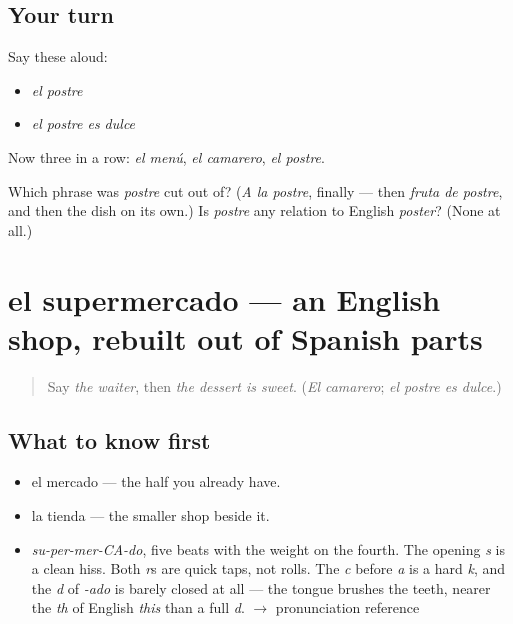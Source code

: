 \subsection*{Your turn}
Say these aloud:

\begin{itemize}
\raggedright
  \item \emph{el postre}
  \item \emph{el postre es dulce}
\end{itemize}

Now three in a row: \emph{el menú}, \emph{el camarero}, \emph{el postre}.

\begin{tcolorbox}[breakable,colback=teal!4,colframe=teal!35!black,title={Before you move on}]
Which phrase was \emph{postre} cut out of? (\emph{A la postre}, finally — then \emph{fruta de postre}, and then the dish on its own.) Is \emph{postre} any relation to English \emph{poster}? (None at all.)
\end{tcolorbox}
\section[el supermercado]{el supermercado — an English shop, rebuilt out of Spanish parts}

\label{lesson:ES-C391-supermercado}



\begin{quote}
Say \emph{the waiter}, then \emph{the dessert is sweet}. (\emph{El camarero}; \emph{el postre es dulce}.)
\end{quote}

\subsection*{What to know first}
\begin{itemize}
\raggedright
  \item el mercado — the half you already have.
  \item la tienda — the smaller shop beside it.
\end{itemize}

\begin{sounds}
\begin{itemize}
\raggedright
  \item \emph{su-per-mer-CA-do}, five beats with the weight on the fourth. The opening \emph{s} is a clean hiss. Both \emph{r}s are quick taps, not rolls. The \emph{c} before \emph{a} is a hard \emph{k}, and the \emph{d} of \emph{-ado} is barely closed at all — the tongue brushes the teeth, nearer the \emph{th} of English \emph{this} than a full \emph{d}. $\to$ pronunciation reference
\end{itemize}
\end{sounds}

